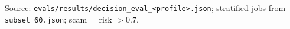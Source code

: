 Source: \texttt{evals/results/decision\_eval\_<profile>.json}; stratified jobs from \texttt{subset\_60.json}; scam = risk $>0.7$.
